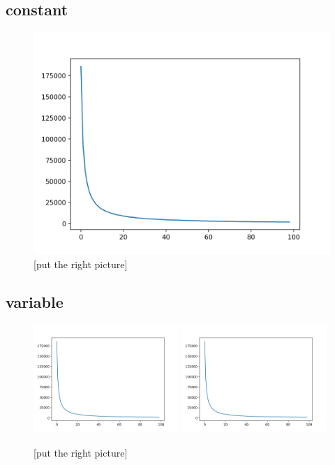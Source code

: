 \subsection{constant}\label{sec:constant}
\begin{figure}[htb]
  \centering
  \includegraphics[width=\textwidth,height=\textheight,keepaspectratio]{img/skew-alpha1.png}
  \caption[The architecture of the system]{ [put the right picture] }
  \label{fig:b+tree}
\end{figure}
\newpage
\subsection{variable}\label{sec:variable}
\begin{figure}[htb]
  \centering
  \includegraphics[width=0.49\textwidth,height=\textheight,keepaspectratio]{img/skew-alpha1.png}
  \includegraphics[width=0.49\textwidth,height=\textheight,keepaspectratio]{img/skew-alpha1.png}
  \caption[The architecture of the system]{ [put the right picture] }
  \label{fig:b+tree}
\end{figure}
